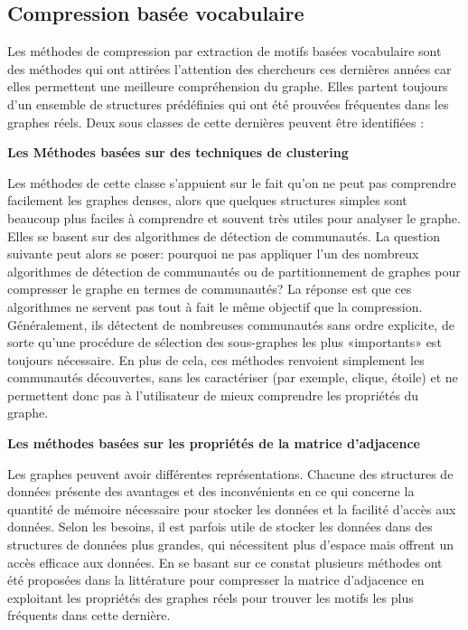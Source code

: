 \documentclass[a4paper,oneside,12pt]{report}
\theoremstyle{definition}
\begin{document}
				\subsection{Compression basée vocabulaire}
				\label{vog_desc}
				Les méthodes de compression par extraction de motifs basées vocabulaire sont des méthodes qui ont attirées l'attention des chercheurs ces dernières années car elles permettent une meilleure compréhension du graphe. Elles partent toujours d'un ensemble de structures prédéfinies qui ont été prouvées fréquentes dans les graphes réels. Deux sous classes de cette dernières peuvent être identifiées :
				 
					 \textbf{Les Méthodes basées sur des techniques de clustering}
							
							Les méthodes de cette classe s'appuient sur le fait qu'on ne peut pas comprendre facilement les graphes denses, alors que quelques structures simples sont beaucoup plus faciles à comprendre et souvent très utiles pour analyser le graphe. Elles se basent sur des algorithmes de détection de communautés. 
							La question suivante peut alors se poser: pourquoi ne pas appliquer l'un des nombreux algorithmes de détection de communautés ou de partitionnement de graphes pour compresser le graphe en termes de communautés? La réponse est que ces algorithmes ne servent pas tout à fait le même objectif que la compression. Généralement, ils détectent de nombreuses communautés sans ordre explicite, de sorte qu'une procédure de sélection des sous-graphes les plus «importants» est toujours nécessaire. En plus de cela, ces méthodes renvoient simplement les communautés découvertes, sans les caractériser (par exemple, clique, étoile) et ne permettent donc pas à l'utilisateur de mieux comprendre les propriétés du graphe. 
							
							
							
							
							
		
					 \textbf{Les méthodes basées sur les propriétés de la matrice d'adjacence}
							
							Les graphes peuvent avoir différentes représentations. Chacune des structures de données présente des avantages et des inconvénients en ce qui concerne la quantité de mémoire nécessaire pour stocker les données et la facilité d'accès aux données. Selon les besoins, il est parfois utile de stocker les données dans des structures de données plus grandes, qui nécessitent plus d'espace mais offrent un accès efficace aux données. En se basant sur ce constat plusieurs méthodes ont été  proposées dans la littérature pour compresser la matrice d'adjacence en exploitant les propriétés des graphes réels pour trouver les motifs les plus fréquents dans cette dernière.
							
\end{document}
